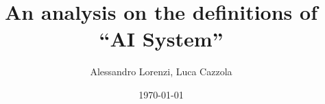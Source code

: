 \documentclass{beamer}
\title[AI System definitions]{An analysis on the definitions of “AI System”} %
\author{Alessandro Lorenzi, Luca Cazzola} %
\institute[UNITN] %
{
University of Trento \\ %
\medskip
}
\date{\today} %
\begin{document}
\begin{frame}
\titlepage %
\end{frame}






\end{document}
